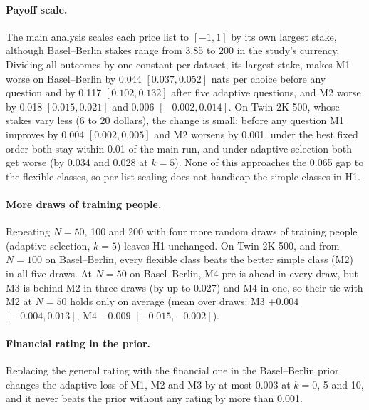 \documentclass{article}
\begin{document}
\paragraph{Payoff scale.} The main analysis scales each price list to $[-1, 1]$ by its own largest stake, although Basel--Berlin stakes range from 3.85 to 200 in the study's currency. Dividing all outcomes by one constant per dataset, its largest stake, makes M1 worse on Basel--Berlin by 0.044 $[0.037, 0.052]$ nats per choice before any question and by 0.117 $[0.102, 0.132]$ after five adaptive questions, and M2 worse by 0.018 $[0.015, 0.021]$ and 0.006 $[-0.002, 0.014]$. On Twin-2K-500, whose stakes vary less (6 to 20 dollars), the change is small: before any question M1 improves by 0.004 $[0.002, 0.005]$ and M2 worsens by 0.001, under the best fixed order both stay within 0.01 of the main run, and under adaptive selection both get worse (by 0.034 and 0.028 at $k = 5$). None of this approaches the 0.065 gap to the flexible classes, so per-list scaling does not handicap the simple classes in H1.

\paragraph{More draws of training people.} Repeating $N = 50$, 100 and 200 with four more random draws of training people (adaptive selection, $k = 5$) leaves H1 unchanged. On Twin-2K-500, and from $N = 100$ on Basel--Berlin, every flexible class beats the better simple class (M2) in all five draws. At $N = 50$ on Basel--Berlin, M4-pre is ahead in every draw, but M3 is behind M2 in three draws (by up to 0.027) and M4 in one, so their tie with M2 at $N = 50$ holds only on average (mean over draws: M3 $+0.004$ $[-0.004, 0.013]$, M4 $-0.009$ $[-0.015, -0.002]$).

\paragraph{Financial rating in the prior.} Replacing the general rating with the financial one in the Basel--Berlin prior changes the adaptive loss of M1, M2 and M3 by at most 0.003 at $k = 0$, 5 and 10, and it never beats the prior without any rating by more than 0.001.

\newpage
\newcommand{\finalonly}[1]{#1}

\end{document}
